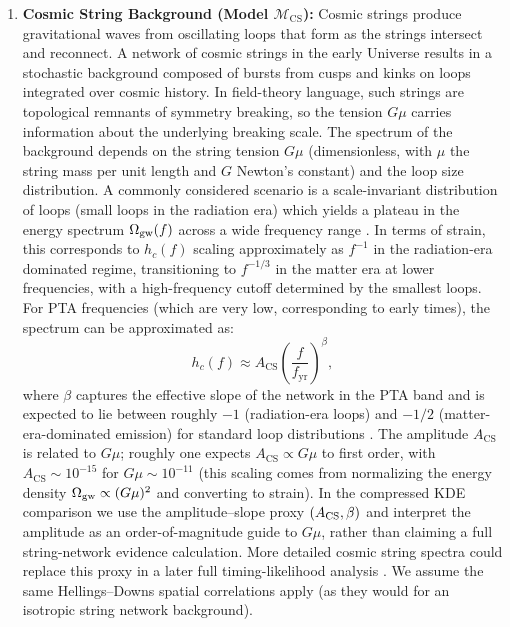 \documentclass[symmetry,article,submit,pdftex,moreauthors]{Definitions/mdpi}
\begin{document}
\begin{enumerate}
    \item \textbf{Cosmic String Background (Model $\mathcal{M}_\mathrm{CS}$):} Cosmic strings produce gravitational waves from oscillating loops that form as the strings intersect and reconnect. A network of cosmic strings in the early Universe results in a stochastic background composed of bursts from cusps and kinks on loops integrated over cosmic history. In field-theory language, such strings are topological remnants of symmetry breaking, so the tension $G\mu$ carries information about the underlying breaking scale. The spectrum of the background depends on the string tension $G\mu$ (dimensionless, with $\mu$ the string mass per unit length and $G$ Newton's constant) and the loop size distribution. A commonly considered scenario is a scale-invariant distribution of loops (small loops in the radiation era) which yields a plateau in the energy spectrum $\Omega_{\rm gw}(f)$ across a wide frequency range \cite{BlancoPillado2018}. In terms of strain, this corresponds to $h_c(f)$ scaling approximately as $f^{-1}$ in the radiation-era dominated regime, transitioning to $f^{-1/3}$ in the matter era at lower frequencies, with a high-frequency cutoff determined by the smallest loops. For PTA frequencies (which are very low, corresponding to early times), the spectrum can be approximated as:
    \begin{equation}\label{eq:cs_spectrum}
        h_c(f) \approx A_{\mathrm{CS}} \left(\frac{f}{f_{\mathrm{yr}}}\right)^{\beta}\!,
    \end{equation}
    where $\beta$ captures the effective slope of the network in the PTA band and is expected to lie between roughly $-1$ (radiation-era loops) and $-1/2$ (matter-era-dominated emission) for standard loop distributions \cite{Ellis2023}. The amplitude $A_{\mathrm{CS}}$ is related to $G\mu$; roughly one expects $A_{\mathrm{CS}} \propto G\mu$ to first order, with $A_{\mathrm{CS}}\sim 10^{-15}$ for $G\mu \sim 10^{-11}$ (this scaling comes from normalizing the energy density $\Omega_{\rm gw} \propto (G\mu)^2$ and converting to strain). In the compressed KDE comparison we use the amplitude--slope proxy $(A_{\rm CS},\beta)$ and interpret the amplitude as an order-of-magnitude guide to $G\mu$, rather than claiming a full string-network evidence calculation. More detailed cosmic string spectra could replace this proxy in a later full timing-likelihood analysis \cite{BlancoPillado2018,Ellis2023}. We assume the same Hellings--Downs spatial correlations apply (as they would for an isotropic string network background).
    

\end{enumerate}
\end{document}

